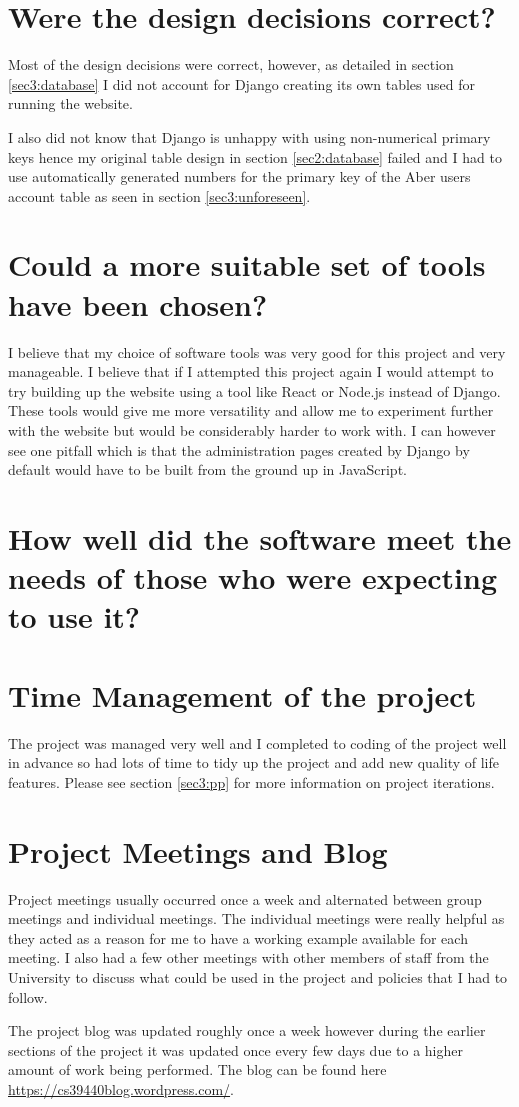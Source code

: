 \section{Were the design decisions correct?}
Most of the design decisions were correct, however, as detailed in section \ref{sec3:database} I did not account for Django creating its own tables used for running the website. 

I also did not know that Django is unhappy with using non-numerical primary keys hence my original table design in section \ref{sec2:database} failed and I had to use automatically generated numbers for the primary key of the Aber users account table as seen in section \ref{sec3:unforeseen}.

\section{Could a more suitable set of tools have been chosen?}
I believe that my choice of software tools was very good for this project and very manageable. I believe that if I attempted this project again I would attempt to try building up the website using a tool like React or Node.js instead of Django. These tools would give me more versatility and allow me to experiment further with the website but would be considerably harder to work with. I can however see one pitfall which is that the administration pages created by Django by default would have to be built from the ground up in JavaScript.

\section{How well did the software meet the needs of those who were expecting to use it?}

\section{Time Management of the project}
The project was managed very well and I completed to coding of the project well in advance so had lots of time to tidy up the project and add new quality of life features. Please see section \ref{sec3:pp} for more information on project iterations.

\section{Project Meetings and Blog}
Project meetings usually occurred once a week and alternated between group meetings and individual meetings. The individual meetings were really helpful as they acted as a reason for me to have a working example available for each meeting. I also had a few other meetings with other members of staff from the University to discuss what could be used in the project and policies that I had to follow. 

The project blog was updated roughly once a week however during the earlier sections of the project it was updated once every few days due to a higher amount of work being performed. The blog can be found here \href{https://cs39440blog.wordpress.com/}{https://cs39440blog.wordpress.com/}.
